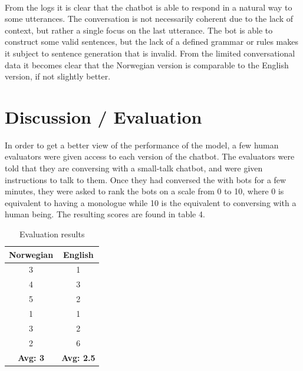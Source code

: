 \documentclass{article}
\begin{document}
\paragraph{}
From the logs it is clear that the chatbot is able to respond in a natural way
to some utterances. The conversation is not necessarily coherent due to the
lack of context, but rather a single focus on the last utterance. The bot is
able to construct some valid sentences, but the lack of a defined grammar or
rules makes it subject to sentence generation that is invalid. From the
limited conversational data it becomes clear that the Norwegian
version is comparable to the English version, if not slightly better.

\section*{Discussion / Evaluation}



In order to get a better view of the performance of the model, a few human
evaluators were given access to each version of the chatbot. The evaluators
were told that they are conversing with a small-talk chatbot, and were given
instructions to talk to them. Once they had conversed the with bots for a few
minutes, they were asked to rank the bots on a scale from 0 to 10, where 0
is equivalent to having a monologue while 10 is the equivalent to conversing
with a human being. The resulting scores are found in table 4.

\begin{table}[hbt!]
    \centering
    \begin{tabular}{|c|c|}
        \hline
        \textbf{Norwegian} & \textbf{English}\\
        \hline
        3 & 1\\
        4 & 3\\
        5 & 2\\
        1 & 1\\
        3 & 2\\
        2 & 6\\
        \hline
        \textbf{Avg: 3} & \textbf{Avg: 2.5}\\
        \hline
    \end{tabular}
    \caption{Evaluation results}
    \label{tab:evaluation-results}
\end{table}
\end{document}
